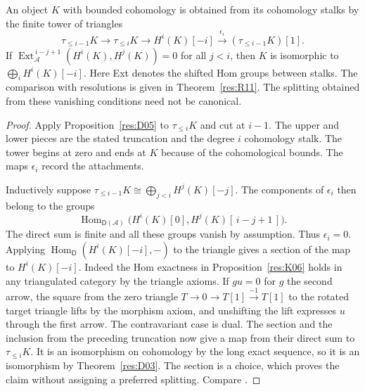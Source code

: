 \begin{proposition}
\label{res:D08}
An object \(K\) with bounded cohomology is obtained from its cohomology
stalks by the finite tower of triangles
\[
 \tau_{\le i-1}K\longrightarrow\tau_{\le i}K
 \longrightarrow H^i(K)[-i]\xrightarrow{\epsilon_i}
            (\tau_{\le i-1}K)[1].
\]
If
\(\operatorname{Ext}^{\,i-j+1}_{\mathcal A}(H^i(K),H^j(K))=0\)
for all \(j<i\), then \(K\) is isomorphic to
\(\bigoplus_i H^i(K)[-i]\). Here Ext denotes the shifted Hom groups
between stalks. The comparison with resolutions is given in
Theorem~\ref{res:R11}. The splitting obtained from these
vanishing conditions need not be canonical.
\end{proposition}
\begin{proof}
Apply Proposition~\ref{res:D05} to \(\tau_{\le i}K\) and cut at
\(i-1\). The upper and lower pieces are the stated truncation and
the degree \(i\) cohomology stalk. The tower begins at zero and
ends at \(K\) because of the cohomological bounds. The maps
\(\epsilon_i\) record the attachments.

Inductively suppose \(\tau_{\le i-1}K\cong
\bigoplus_{j<i} H^j(K)[-j]\). The components of \(\epsilon_i\) then
belong to the groups
\[
 \operatorname{Hom}_{\mathsf D(\mathcal A)}
       \bigl(H^i(K)[0],H^j(K)[\,i-j+1\,]\bigr).
\]
The direct sum is finite and all these groups vanish by assumption.
Thus \(\epsilon_i=0\). Applying
\(\operatorname{Hom}_{\mathsf D}(H^i(K)[-i],-)\) to the triangle
gives a section of the map to \(H^i(K)[-i]\). Indeed the Hom
exactness in Proposition~\ref{res:K06} holds in any triangulated
category by the triangle axioms. If \(g u=0\) for \(g\) the
second arrow, the square from the zero triangle
\(T\to 0\to T[1]\xrightarrow{-1}T[1]\) to the rotated target
triangle lifts by the morphism axiom, and unshifting the lift
expresses \(u\) through the first arrow. The contravariant case
is dual. The section and the inclusion from the preceding
truncation now give a map from their direct sum to
\(\tau_{\le i}K\). It is an isomorphism on cohomology by the long
exact sequence, so it is an isomorphism by
Theorem~\ref{res:D03}. The section is a choice, which proves the
claim without assigning a preferred splitting.
Compare \cite[Tags 08J5, 0GM4, and 0EWX]{stacks-derived}.
\end{proof}
